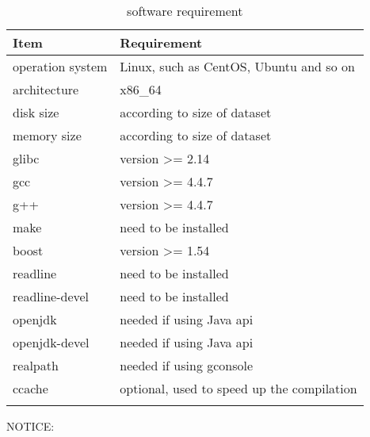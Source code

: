\documentclass[titlepage, a4paper, 12pt]{article}
\begin{document}
\begin{longtable}[c]{@{}ll@{}}
\toprule
Item & Requirement\tabularnewline
\midrule
\endhead
operation system & Linux, such as CentOS, Ubuntu and so on\tabularnewline
architecture & x86\_64\tabularnewline
disk size & according to size of dataset\tabularnewline
memory size & according to size of dataset\tabularnewline
glibc & version \textgreater{}= 2.14\tabularnewline
gcc & version \textgreater{}= 4.4.7\tabularnewline
g++ & version \textgreater{}= 4.4.7\tabularnewline
make & need to be installed\tabularnewline
boost & version >= 1.54\tabularnewline
readline & need to be installed\tabularnewline
readline-devel & need to be installed\tabularnewline
openjdk & needed if using Java api\tabularnewline
openjdk-devel & needed if using Java api\tabularnewline
realpath & needed if using gconsole\tabularnewline
ccache & optional, used to speed up the compilation\tabularnewline
\bottomrule
\caption{software requirement}
\end{longtable}

NOTICE:
\end{document}

